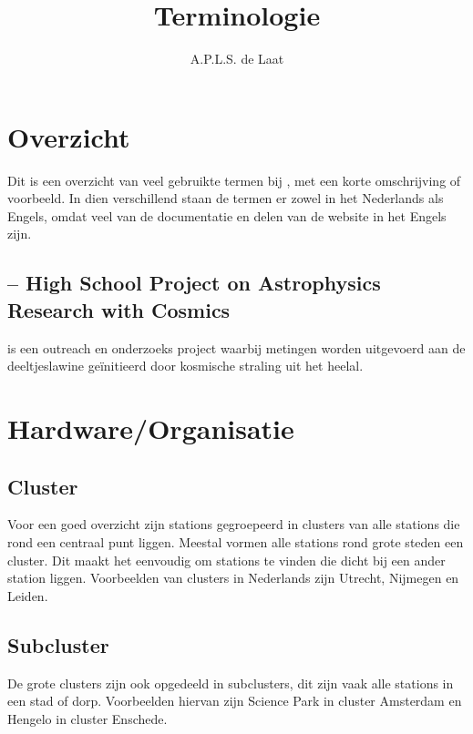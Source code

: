 

\title{Terminologie}
\author{A.P.L.S. de Laat}



\maketitle

\section{Overzicht}

Dit is een overzicht van veel gebruikte termen bij \hisparc, met een
korte omschrijving of voorbeeld. In dien verschillend staan de termen er
zowel in het Nederlands als Engels, omdat veel van de documentatie en
delen van de website in het Engels zijn.


\subsection{\hisparc -- High School Project on Astrophysics Research
            with Cosmics}

\hisparc is een outreach en onderzoeks project waarbij metingen worden
uitgevoerd aan de deeltjeslawine geïnitieerd door kosmische straling uit
het heelal.


\section{Hardware/Organisatie}


\subsection{Cluster}

Voor een goed overzicht zijn stations gegroepeerd in clusters van alle
stations die rond een centraal punt liggen. Meestal vormen alle stations
rond grote steden een cluster. Dit maakt het eenvoudig om stations te
vinden die dicht bij een ander station liggen. Voorbeelden van clusters
in Nederlands zijn Utrecht, Nijmegen en Leiden.


\subsection{Subcluster}

De grote clusters zijn ook opgedeeld in subclusters, dit zijn vaak alle
stations in een stad of dorp. Voorbeelden hiervan zijn Science Park in
cluster Amsterdam en Hengelo in cluster Enschede.


